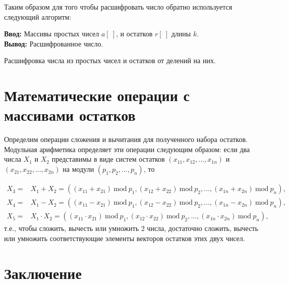 \documentclass[10pt]{article}
\begin{document}
Таким образом для того чтобы расшифровать число обратно используется следующий алгоритм:

\begin{algorithm}[H]
	\textbf{Ввод:} Массивы простых чисел $a[~]$, и остатков $r[~]$ длины $k$.\\
	\textbf{Вывод:} Расшифрованное число.
	\begin{algorithmic}
	\end{algorithmic}
	\caption{Расшифровка числа из простых чисел и остатков от делений на них.}
	\label{algo:crt_decription}
\end{algorithm}


\section{Математические операции с массивами остатков}

Определим операции сложения и вычитания для полученного набора остатков. Модульная арифметика \cite{omondi2007residue, soderstrand1986residue} определяет эти операции следующим образом: если два числа $X_1$ и $X_2$ представимы в виде систем остатков $(x_{11}, x_{12}, ..., x_{1n}) $ и $(x_{21}, x_{22}, ..., x_{2n})$ на модули $(p_1, p_2, ..., p_n)$, то 

\begin{eqnarray}
	X_3 = &X_1 + X_2 = ((x_{11} + x_{21})\ \mathrm{mod}\ p_1, (x_{12} + x_{22})\ \mathrm{mod}\ p_2, ..., (x_{1n} + x_{2n})\ \mathrm{mod}\ p_n), \\
	X_4 = &X_1 - X_2 = ((x_{11} - x_{21})\ \mathrm{mod}\ p_1, (x_{12} - x_{22})\ \mathrm{mod}\ p_2, ..., (x_{1n} - x_{2n})\ \mathrm{mod}\ p_n), \\
	X_5 = &X_1 \cdot X_2 = ((x_{11} \cdot x_{21})\ \mathrm{mod}\ p_1, (x_{12} \cdot x_{22})\ \mathrm{mod}\ p_2, ..., (x_{1n} \cdot x_{2n})\ \mathrm{mod}\ p_n), 
\end{eqnarray}
т.е., чтобы сложить, вычесть или умножить 2 числа, достаточно сложить, вычесть или умножить соответствующие элементы векторов остатков этих двух чисел. 


\section{Заключение}
\end{document}
